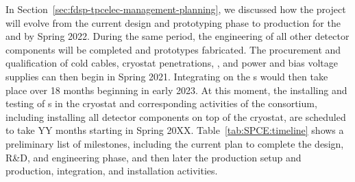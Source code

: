 In Section~\ref{sec:fdsp-tpcelec-management-planning}, we  
discussed how the project will evolve from the current design
and prototyping phase to production for the 
and  by Spring 2022. During the same  
period, the engineering of all other detector components will
be completed and prototypes fabricated. The procurement
and qualification of cold cables, cryostat penetrations, ,
and power and bias voltage supplies can then begin in Spring 2021.
Integrating  on the s would then
take place over 18 months beginning in early 2023. At
this moment, the installing and testing of s in 
the cryostat and corresponding activities of the  consortium, including installing all 
detector components on top of the cryostat, are scheduled to
take YY months starting in Spring 20XX. Table~\ref{tab:SPCE:timeline} shows a preliminary list of 
milestones, including the current plan to complete  
the design, R\&D, and engineering phase, and then later  
the production setup and production, integration,
and installation activities.

